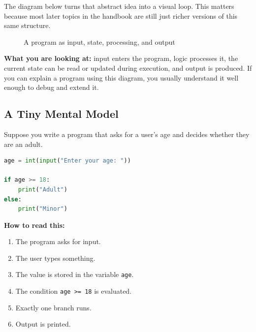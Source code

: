 \documentclass[12pt, a4paper, oneside]{book}
\begin{document}
The diagram below turns that abstract idea into a visual loop. This matters because most later topics in the handbook are still just richer versions of this same structure.

\begin{figure}[H]
\centering
{}
\caption{A program as input, state, processing, and output}
\label{fig:program-state-flow}
\end{figure}

\textbf{What you are looking at:} input enters the program, logic processes it, the current state can be read or updated during execution, and output is produced. If you can explain a program using this diagram, you usually understand it well enough to debug and extend it.

\subsection{A Tiny Mental Model}
Suppose you write a program that asks for a user's age and decides whether they are an adult.

\begin{lstlisting}[language=Python, caption={A tiny program and its state changes}]
age = int(input("Enter your age: "))

if age >= 18:
    print("Adult")
else:
    print("Minor")
\end{lstlisting}

\textbf{How to read this:}
\begin{enumerate}[leftmargin=2em]
    \item The program asks for input.
    \item The user types something.
    \item The value is stored in the variable \texttt{age}.
    \item The condition \texttt{age >= 18} is evaluated.
    \item Exactly one branch runs.
    \item Output is printed.
\end{enumerate}
\end{document}

